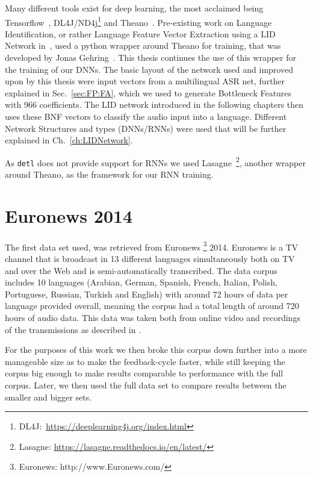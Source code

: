 Many different tools exist for deep learning, the most acclaimed being Tensorflow~\cite{DBLP:journals/corr/AbadiABBCCCDDDG16}, DL4J/ND4j\footnote{DL4J:~\url{https://deeplearning4j.org/index.html}} and Theano~\cite{bergstra2011theano}. Pre-existing work on Language Identification, or rather Language Feature Vector Extraction using a LID Network in~\cite{Mueller2016b}, used a python wrapper around Theano for training, that was developed by Jonas Gehring~\cite{gehringMA}. This thesis continues the use of this wrapper for the training of our DNNs. The basic layout of the network used and improved upon by this thesis were input vectors from a multilingual ASR net, further explained in Sec.~\ref{sec:FP:FA}, which we used to generate Bottleneck Features with 966 coefficients. The LID network introduced in the following chapters then uses these BNF vectors to classify the audio input into a language. Different Network Structures and types (DNNs/RNNs) were used that will be further explained in Ch.~\ref{ch:LIDNetwork}. 

As \texttt{detl} does not provide support for RNNs we used Lasagne~\footnote{Lasagne: \url{https://lasagne.readthedocs.io/en/latest/}}, another wrapper around Theano, as the framework for our RNN training.

\section{Euronews 2014}
\label{sec:LITasks:Euronews}


The first data set used, was retrieved from Euronews \footnote{Euronews: http://www.Euronews.com/} 2014. Euronews is a TV channel that is broadcast in 13 different languages simultaneously both on TV and over the Web and is semi-automatically transcribed. The data corpus includes 10 languages (Arabian, German, Spanish, French, Italian, Polish, Portuguese, Russian, Turkish and English) with around 72 hours of data per language provided overall, meaning the corpus had a total length of around 720 hours of audio data. This data was taken both from online video and recordings of the transmissions as described in \cite{gretter2014Euronews}.

For the purposes of this work we then broke this corpus down further into a more manageable size as to make the feedback-cycle faster, while still keeping the corpus big enough to make results comparable to performance with the full corpus. Later, we then used the full data set to compare results between the smaller and bigger sets.

